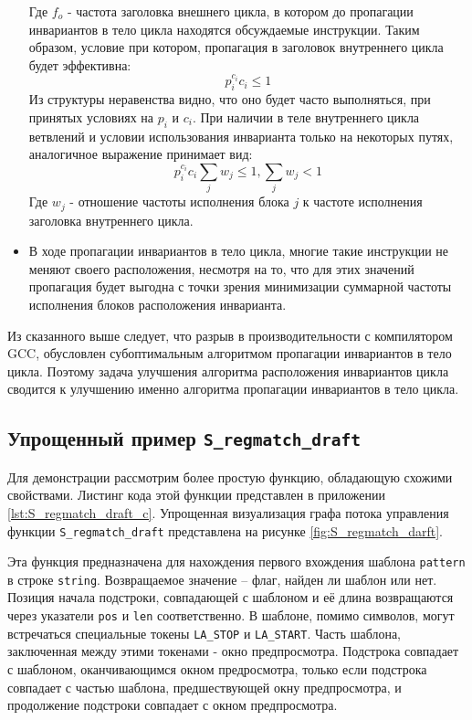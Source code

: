 \begin{itemize}
        Где $f_o$ - частота заголовка внешнего цикла, в котором до пропагации инвариантов в тело цикла находятся обсуждаемые инструкции.
        Таким образом, условие при котором, пропагация в заголовок внутреннего цикла будет эффективна:
        $$ p_i^{c_i}  c_i \leq 1 $$
        Из структуры неравенства видно, что оно будет часто выполняться, при принятых условиях на $p_i$ и $c_i$.
        При наличии в теле внутреннего цикла ветвлений и условии использования инварианта только на некоторых путях, аналогичное выражение принимает вид:
        $$ p_i^{c_i} c_i \sum_j{w_j} \leq 1 , \sum_j{w_j} < 1 $$
        Где $w_j$ - отношение частоты исполнения блока $j$ к частоте исполнения заголовка внутреннего цикла.
    \item В ходе пропагации инвариантов в тело цикла, многие такие инструкции не меняют своего расположения, несмотря на то, что для этих значений пропагация будет выгодна с точки зрения минимизации суммарной частоты исполнения блоков расположения инварианта.
\end{itemize}

Из сказанного выше следует, что разрыв в производительности с компилятором GCC, обусловлен субоптимальным алгоритмом пропагации инвариантов в тело цикла.
Поэтому задача улучшения алгоритма расположения инвариантов цикла сводится к улучшению именно алгоритма пропагации инвариантов в тело цикла.

\subsection{Упрощенный пример \texttt{S\_regmatch\_draft}}

Для демонстрации рассмотрим более простую функцию, обладающую схожими свойствами.
Листинг кода этой функции представлен в приложении \ref{lst:S_regmatch_draft_c}.
Упрощенная визуализация графа потока управления функции \texttt{S\_regmatch\_draft} представлена на рисунке \ref{fig:S_regmatch_darft}.

Эта функция предназначена для нахождения первого вхождения шаблона \texttt{pattern} в строке \texttt{string}.
Возвращаемое значение -- флаг, найден ли шаблон или нет.
Позиция начала подстроки, совпадающей с шаблоном и её длина возвращаются через указатели \texttt{pos} и \texttt{len} соответственно.
В шаблоне, помимо символов, могут встречаться специальные токены \texttt{LA\_STOP} и \texttt{LA\_START}.
Часть шаблона, заключенная между этими токенами - окно предпросмотра.
Подстрока совпадает с шаблоном, оканчивающимся окном предросмотра, только если подстрока совпадает с частью шаблона, предшествующей окну предпросмотра, и продолжение подстроки совпадает с окном предпросмотра.

